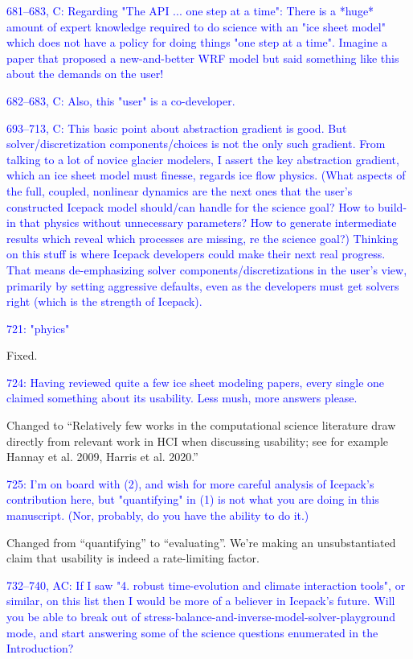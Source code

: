 \documentclass{article}
\theoremstyle{definition}
\theoremstyle{plain}
\begin{document}
\textcolor{blue}{681--683, C:  Regarding "The API ... one step at a time":  There is a *huge* amount of expert knowledge required to do science with an "ice sheet model" which does not have a policy for doing things "one step at a time".  Imagine a paper that proposed a new-and-better WRF model but said something like this about the demands on the user!}

\textcolor{blue}{682--683, C:  Also, this "user" is a co-developer.}

\textcolor{blue}{693--713, C:  This basic point about abstraction gradient is good.  But solver/discretization components/choices is not the only such gradient.  From talking to a lot of novice glacier modelers, I assert the key abstraction gradient, which an ice sheet model must finesse, regards ice flow physics.  (What aspects of the full, coupled, nonlinear dynamics are the next ones that the user's constructed Icepack model should/can handle for the science goal?  How to build-in that physics without unnecessary parameters?  How to generate intermediate results which reveal which processes are missing, re the science goal?)  Thinking on this stuff is where Icepack developers could make their next real progress.  That means de-emphasizing solver components/discretizations in the user's view, primarily by setting aggressive defaults, even as the developers must get solvers right (which is the strength of Icepack).}

\textcolor{blue}{721:  "phyics"}

Fixed.

\textcolor{blue}{724:  Having reviewed quite a few ice sheet modeling papers, every single one claimed something about its usability.  Less mush, more answers please.}

Changed to ``Relatively few works in the computational science literature draw directly from relevant work in HCI when discussing usability; see for example Hannay et al. 2009, Harris et al. 2020.''

\textcolor{blue}{725:  I'm on board with (2), and wish for more careful analysis of Icepack's contribution here, but "quantifying" in (1) is not what you are doing in this manuscript.  (Nor, probably, do you have the ability to do it.)}

Changed from ``quantifying'' to ``evaluating''.
We're making an unsubstantiated claim that usability is indeed a rate-limiting factor.

\textcolor{blue}{732--740, AC:  If I saw "4. robust time-evolution and climate interaction tools", or similar, on this list then I would be more of a believer in Icepack's future.  Will you be able to break out of stress-balance-and-inverse-model-solver-playground mode, and start answering some of the science questions enumerated in the Introduction?}
\end{document}
